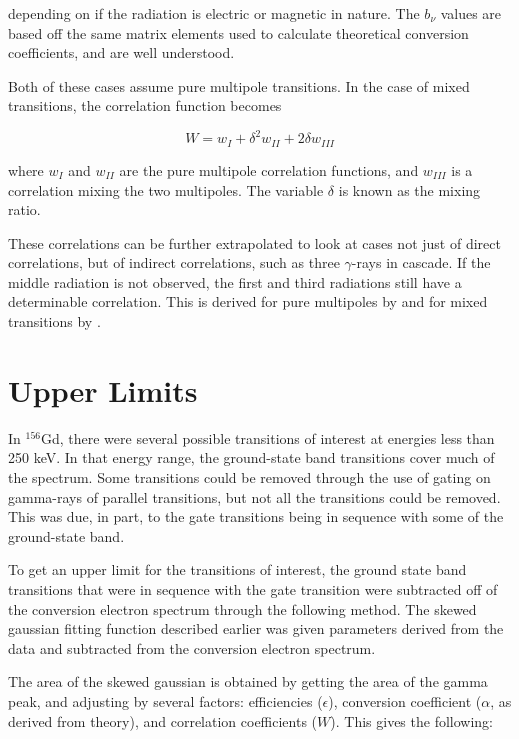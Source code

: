 depending on if the radiation is electric or magnetic in nature. The $b_\nu$ values are based off the same matrix elements used to calculate theoretical conversion coefficients, and are well understood\citep{rose51:_internal_conversion, rose52:_internal_conversion}.

Both of these cases assume pure multipole transitions. In the case of mixed transitions, the correlation function becomes

\begin{equation}
    W = w_I + \delta^2 w_{II} + 2\delta w_{III}
    \label{eq:mixed_corr}
\end{equation}

where $w_I$ and $w_{II}$ are the pure multipole correlation functions, and $w_{III}$ is a correlation mixing the two multipoles. The variable $\delta$ is known as the mixing ratio. 

These correlations can be further extrapolated to look at cases not just of direct correlations, but of indirect correlations, such as three $\gamma$-rays in cascade. If the middle radiation is not observed, the first and third radiations still have a determinable correlation. This is derived for pure multipoles by \citep{biedenharn53:_theory_angular_corr} and for mixed transitions by \citep{rose53:_angular_corr_supp,osborn53:_angular_corr_3}.

\section{Upper Limits}
\label{sec:upper_limit}

In $^{156}$Gd, there were several possible transitions of interest at energies less than 250 keV. In that energy range, the ground-state band transitions cover much of the spectrum. Some transitions could be removed through the use of gating on gamma-rays of parallel transitions, but not all the transitions could be removed. This was due, in part, to the gate transitions being in sequence with some of the ground-state band. 

To get an upper limit for the transitions of interest, the ground state band transitions that were in sequence with the gate transition were subtracted off of the conversion electron spectrum through the following method. The skewed gaussian fitting function described earlier was given parameters derived from the data and subtracted from the conversion electron spectrum.

The area of the skewed gaussian is obtained by getting the area of the gamma peak, and adjusting by several factors: efficiencies ($\epsilon$), conversion coefficient ($\alpha$, as derived from theory), and correlation coefficients ($W$). This gives the following:


